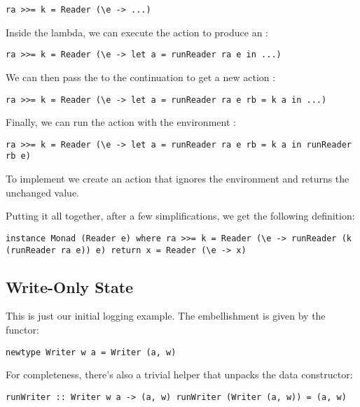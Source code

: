 \begin{verbatim}
ra >>= k = Reader (\e -> ...)
\end{verbatim}

Inside the lambda, we can execute the action  to produce an
:

\begin{verbatim}
ra >>= k = Reader (\e -> let a = runReader ra e in ...)
\end{verbatim}

We can then pass the  to the continuation  to get a
new action :

\begin{verbatim}
ra >>= k = Reader (\e -> let a = runReader ra e rb = k a in ...)
\end{verbatim}

Finally, we can run the action  with the environment
:

\begin{verbatim}
ra >>= k = Reader (\e -> let a = runReader ra e rb = k a in runReader rb e)
\end{verbatim}

To implement  we create an action that ignores the
environment and returns the unchanged value.

Putting it all together, after a few simplifications, we get the
following definition:

\begin{verbatim}
instance Monad (Reader e) where ra >>= k = Reader (\e -> runReader (k (runReader ra e)) e) return x = Reader (\e -> x)
\end{verbatim}

\subsection{Write-Only State}\label{write-only-state}

This is just our initial logging example. The embellishment is given by
the  functor:

\begin{verbatim}
newtype Writer w a = Writer (a, w)
\end{verbatim}

For completeness, there's also a trivial helper  that
unpacks the data constructor:

\begin{verbatim}
runWriter :: Writer w a -> (a, w) runWriter (Writer (a, w)) = (a, w)
\end{verbatim}

